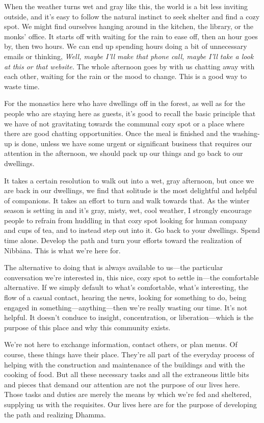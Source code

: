 
When the weather turns wet and gray like this, the world is a bit less 
inviting outside, and it's easy to follow the natural instinct to seek 
shelter and find a cozy spot. We might find ourselves hanging around in 
the kitchen, the library, or the monks' office. It starts off with 
waiting for the rain to ease off, then an hour goes by, then two hours. 
We can end up spending hours doing a bit of unnecessary emails or 
thinking, \emph{Well, maybe I'll make that phone call, maybe I'll take 
a look at this or that website.} The whole afternoon goes by with us 
chatting away with each other, waiting for the rain or the mood to 
change. This is a good way to waste time.

For the monastics here who have dwellings off in the forest, as well as 
for the people who are staying here as guests, it's good to recall the 
basic principle that we have of not gravitating towards the communal 
cozy spot or a place where there are good chatting opportunities. Once 
the meal is finished and the washing-up is done, unless we have some 
urgent or significant business that requires our attention in the 
afternoon, we should pack up our things and go back to our dwellings.

It takes a certain resolution to walk out into a wet, gray afternoon, 
but once we are back in our dwellings, we find that solitude is the 
most delightful and helpful of companions. It takes an effort to turn 
and walk towards that. As the winter season is setting in and it's 
gray, misty, wet, cool weather, I strongly encourage people to refrain 
from huddling in that cozy spot looking for human company and cups of 
tea, and to instead step out into it. Go back to your dwellings. Spend 
time alone. Develop the path and turn your efforts toward the 
realization of Nibbāna. This is what we're here for.

The alternative to doing that is always available to us---the 
particular conversation we're interested in, this nice, cozy spot to 
settle in---the comfortable alternative. If we simply default to what's 
comfortable, what's interesting, the flow of a casual contact, hearing 
the news, looking for something to do, being engaged in 
something---anything---then we're really wasting our time. It's not 
helpful. It doesn't conduce to insight, concentration, or 
liberation---which is the purpose of this place and why this community 
exists.

We're not here to exchange information, contact others, or plan menus. 
Of course, these things have their place. They're all part of the 
everyday process of helping with the construction and maintenance of 
the buildings and with the cooking of food. But all these necessary 
tasks and all the extraneous little bits and pieces that demand our 
attention are not the purpose of our lives here. Those tasks and duties 
are merely the means by which we're fed and sheltered, supplying us 
with the requisites. Our lives here are for the purpose of developing 
the path and realizing Dhamma.

